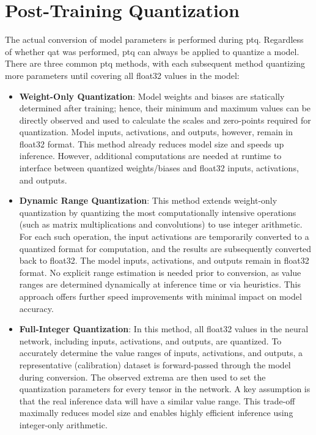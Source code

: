{\section{Post-Training Quantization}

The actual conversion of model parameters is performed during \gls{ptq}.
Regardless of whether \gls{qat} was performed, \gls{ptq} can always be applied to quantize a model.
There are three common \gls{ptq} methods, with each subsequent method quantizing more parameters until covering all \gls{float32} values in the model:

\clearpage
\begin{itemize}[itemsep=0.4\baselineskip]
\item \textbf{Weight-Only Quantization}: Model weights and biases are statically determined after training;
hence, their minimum and maximum values can be directly observed and used to calculate the scales and zero-points required for quantization.
Model inputs, activations, and outputs, however, remain in \gls{float32} format. This method already reduces model size and speeds up inference.
However, additional computations are needed at runtime to interface between quantized weights/biases and \gls{float32} inputs, activations, and outputs.
\item \textbf{Dynamic Range Quantization}: This method extends weight-only quantization by quantizing the most computationally intensive
operations (such as matrix multiplications and convolutions) to use integer arithmetic.
For each such operation, the input activations are temporarily converted to a quantized format for computation, and the results are subsequently converted back to \gls{float32}.
The model inputs, activations, and outputs remain in \gls{float32} format. No explicit range estimation is needed prior to conversion,
as value ranges are determined dynamically at inference time or via heuristics. This approach offers further speed improvements with minimal impact on model accuracy.
\item \textbf{Full-Integer Quantization}: In this method, all \gls{float32} values in the neural network, including inputs, activations, and outputs, are quantized.
To accurately determine the value ranges of inputs, activations, and outputs, a representative (calibration) dataset is forward-passed through the model during conversion.
The observed extrema are then used to set the quantization parameters for every tensor in the network. A key assumption is that the real inference data will have a similar value range.
This trade-off maximally reduces model size and enables highly efficient inference using integer-only arithmetic.
\end{itemize}

}
